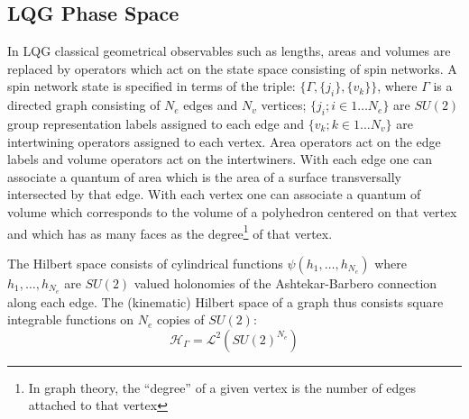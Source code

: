 \documentclass[twocolumn,final,aps,nofootinbib,nobibnotes]{revtex4-2}
\newcommand{\mc}[1]{\mathcal{#1}}
\begin{document}
\subsection{LQG Phase Space}

In LQG classical geometrical observables such as lengths, areas and volumes are replaced by operators which act on the state space consisting of spin networks. A spin network state is specified in terms of the triple: $ \{\Gamma, \{j_i\}, \{v_k\} \} $, where $ \Gamma $ is a directed graph consisting of $ N_e $ edges and $ N_v $ vertices; $ \{ j_i; i \in 1\ldots N_e \} $ are $ SU(2) $ group representation labels assigned to each edge and $ \{v_k; k \in 1 \ldots N_v \} $ are intertwining operators assigned to each vertex. Area operators act on the edge labels and volume operators act on the intertwiners. With each edge one can associate a quantum of area which is the area of a surface transversally intersected by that edge. With each vertex one can associate a quantum of volume which corresponds to the volume of a polyhedron centered on that vertex and which has as many faces as the degree\footnote{In graph theory, the ``degree'' of a given vertex is the number of edges attached to that vertex} of that vertex.

The Hilbert space consists of cylindrical functions $ \psi(h_1, \ldots, h_{N_e}) $ where $ h_1, \ldots, h_{N_e} $ are $ SU(2) $ valued holonomies of the Ashtekar-Barbero connection along each edge. The (kinematic) Hilbert space of a graph thus consists square integrable functions on $ N_e $ copies of $ SU(2) $:
\begin{equation}\label{eqn:lqg-hilbert-1}
	\mc H_\Gamma = \mc L^2(SU(2)^{N_e})
\end{equation}
\end{document}
